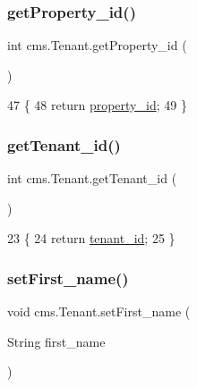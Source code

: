 \subsubsection{\texorpdfstring{get\+Property\+\_\+id()}{getProperty\_id()}}
{\footnotesize\ttfamily int cms.\+Tenant.\+get\+Property\+\_\+id (\begin{DoxyParamCaption}{ }\end{DoxyParamCaption})\hspace{0.3cm}{\ttfamily [inline]}}


\begin{DoxyCode}
47                                 \{
48         \textcolor{keywordflow}{return} \mbox{\hyperlink{classcms_1_1_tenant_a4954483dd78e87b6b4d5e5dac444971e}{property\_id}};
49     \}
\end{DoxyCode}
\mbox{\label{classcms_1_1_tenant_a46db762af1b16b09ecdef6d269cbc082}} 
\subsubsection{\texorpdfstring{get\+Tenant\+\_\+id()}{getTenant\_id()}}
{\footnotesize\ttfamily int cms.\+Tenant.\+get\+Tenant\+\_\+id (\begin{DoxyParamCaption}{ }\end{DoxyParamCaption})\hspace{0.3cm}{\ttfamily [inline]}}


\begin{DoxyCode}
23                               \{
24         \textcolor{keywordflow}{return} \mbox{\hyperlink{classcms_1_1_tenant_a9f6959947f8d1b98471e00b7952f956e}{tenant\_id}};
25     \}
\end{DoxyCode}
\mbox{\label{classcms_1_1_tenant_ab27056aae28594e19b2c0ec12fbdcebe}} 
\subsubsection{\texorpdfstring{set\+First\+\_\+name()}{setFirst\_name()}}
{\footnotesize\ttfamily void cms.\+Tenant.\+set\+First\+\_\+name (\begin{DoxyParamCaption}\item[{String}]{first\+\_\+name }\end{DoxyParamCaption})\hspace{0.3cm}{\ttfamily [inline]}}


